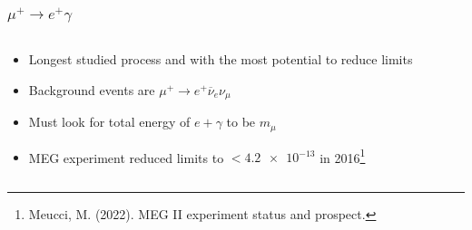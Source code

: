 \documentclass[11pt]{beamer}
\begin{document}
\begin{frame}
    \frametitle{$\mu^+ \rightarrow e^+ \gamma$}
    \begin{columns}[c]
        \begin{column}{0.6\textwidth}
            \begin{itemize}
                \item Longest studied process and with the most potential to reduce limits
                \item Background events are $\mu^+ \rightarrow e^+ \overline{\nu}_e \nu_\mu$ 
                \item Must look for total energy of $e +\gamma$ to be $m_\mu$
                \item MEG experiment reduced limits to $<\num{4.2e-13}$ in 2016\footnote[frame]{Meucci, M. (2022). MEG II experiment status and prospect.}
            \end{itemize}
        \end{column}

        \begin{column}{0.4\textwidth}
            
        \end{column}
    \end{columns}
    

\end{frame}
\end{document}
